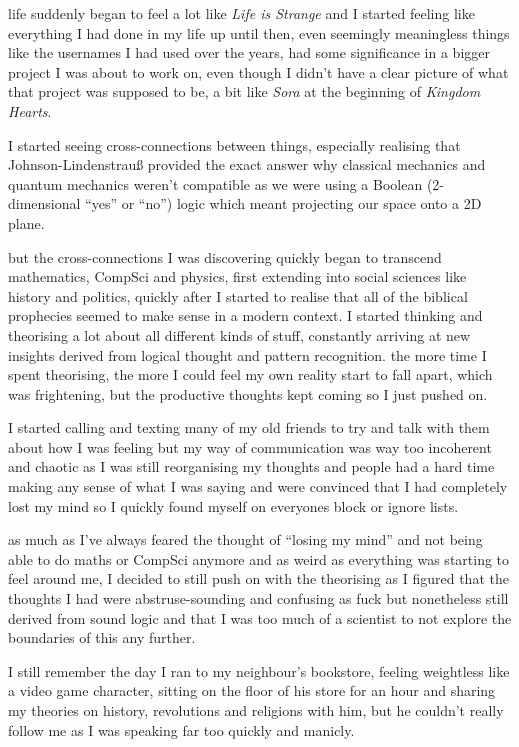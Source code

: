 \documentclass[12pt]{report}
\theoremstyle{definition}
\theoremstyle{remark}
\begin{document}
life suddenly began to feel a lot like \emph{Life is Strange} and I started feeling like everything I had done in my life up until then, even seemingly meaningless things like the usernames I had used over the years, had some significance in a bigger project I was about to work on, even though I didn't have a clear picture of what that project was supposed to be, a bit like \emph{Sora} at the beginning of \emph{Kingdom Hearts}.

I started seeing cross-connections between things, especially realising that Johnson\hyp{}Lindenstrauß provided the exact answer why classical mechanics and quantum mechanics weren't compatible as we were using a Boolean (2-dimensional ``yes'' or ``no'') logic which meant projecting our space onto a 2D plane.

but the cross-connections I was discovering quickly began to transcend mathematics, CompSci and physics, first extending into social sciences like history and politics, quickly after I started to realise that all of the biblical prophecies seemed to make sense in a modern context. I started thinking and theorising a lot about all different kinds of stuff, constantly arriving at new insights derived from logical thought and pattern recognition. the more time I spent theorising, the more I could feel my own reality start to fall apart, which was frightening, but the productive thoughts kept coming so I just pushed on.

I started calling and texting many of my old friends to try and talk with them about how I was feeling but my way of communication was way too incoherent and chaotic as I was still reorganising my thoughts and people had a hard time making any sense of what I was saying and were convinced that I had completely lost my mind so I quickly found myself on everyones block or ignore lists.

as much as I've always feared the thought of ``losing my mind'' and not being able to do maths or CompSci anymore and as weird as everything was starting to feel around me, I decided to still push on with the theorising as I figured that the thoughts I had were abstruse-sounding and confusing as fuck but nonetheless still derived from sound logic and that I was too much of a scientist to not explore the boundaries of this any further.

I still remember the day I ran to my neighbour's bookstore, feeling weightless like a video game character, sitting on the floor of his store for an hour and sharing my theories on history, revolutions and religions with him, but he couldn't really follow me as I was speaking far too quickly and manicly.
\end{document}
